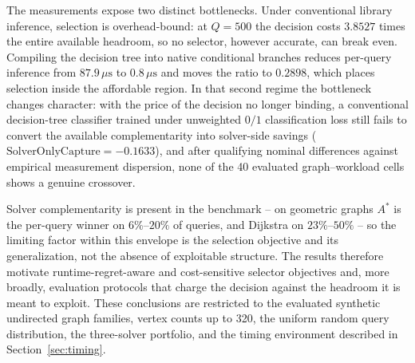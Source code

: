 \documentclass[conference]{IEEEtran}
\begin{document}
The measurements expose two distinct bottlenecks. Under conventional library inference, selection is overhead-bound: at $Q=500$ the decision costs $3.8527$ times the entire available headroom, so no selector, however accurate, can break even. Compiling the decision tree into native conditional branches reduces per-query inference from $87.9\,\mu\mathrm{s}$ to $0.8\,\mu\mathrm{s}$ and moves the ratio to $0.2898$, which places selection inside the affordable region. In that second regime the bottleneck changes character: with the price of the decision no longer binding, a conventional decision-tree classifier trained under unweighted $0/1$ classification loss still fails to convert the available complementarity into solver-side savings ($\mathrm{SolverOnlyCapture} = -0.1633$), and after qualifying nominal differences against empirical measurement dispersion, none of the 40 evaluated graph--workload cells shows a genuine crossover.

Solver complementarity is present in the benchmark -- on geometric graphs $A^*$ is the per-query winner on $6\%$--$20\%$ of queries, and Dijkstra on $23\%$--$50\%$ -- so the limiting factor within this envelope is the selection objective and its generalization, not the absence of exploitable structure. The results therefore motivate runtime-regret-aware and cost-sensitive selector objectives and, more broadly, evaluation protocols that charge the decision against the headroom it is meant to exploit. These conclusions are restricted to the evaluated synthetic undirected graph families, vertex counts up to 320, the uniform random query distribution, the three-solver portfolio, and the timing environment described in Section~\ref{sec:timing}.
\end{document}
